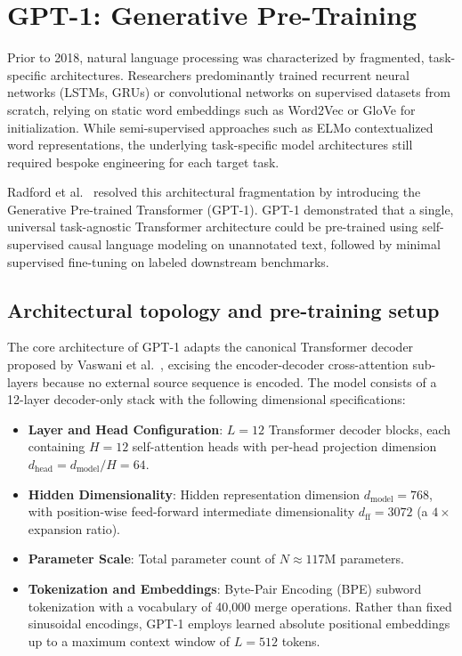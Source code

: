 \documentclass[../../main.tex]{subfiles}
\begin{document}
\section{GPT-1: Generative Pre-Training}
\label{sec:gpt1_architecture}

Prior to 2018, natural language processing was characterized by fragmented, task-specific architectures. Researchers predominantly trained recurrent neural networks (LSTMs, GRUs) or convolutional networks on supervised datasets from scratch, relying on static word embeddings such as Word2Vec or GloVe for initialization. While semi-supervised approaches such as ELMo contextualized word representations, the underlying task-specific model architectures still required bespoke engineering for each target task.

Radford et al.~\cite{radford2018} resolved this architectural fragmentation by introducing the Generative Pre-trained Transformer (GPT-1). GPT-1 demonstrated that a single, universal task-agnostic Transformer architecture could be pre-trained using self-supervised causal language modeling on unannotated text, followed by minimal supervised fine-tuning on labeled downstream benchmarks.


\subsection{Architectural topology and pre-training setup}
\label{subsec:gpt1_setup}

The core architecture of GPT-1 adapts the canonical Transformer decoder proposed by Vaswani et al.~\cite{vaswani2017}, excising the encoder-decoder cross-attention sub-layers because no external source sequence is encoded. The model consists of a 12-layer decoder-only stack with the following dimensional specifications:
\begin{itemize}
    \item \textbf{Layer and Head Configuration}: $L = 12$ Transformer decoder blocks, each containing $H = 12$ self-attention heads with per-head projection dimension $d_{\text{head}} = d_{\text{model}} / H = 64$.
    \item \textbf{Hidden Dimensionality}: Hidden representation dimension $d_{\text{model}} = 768$, with position-wise feed-forward intermediate dimensionality $d_{\text{ff}} = 3072$ (a $4\times$ expansion ratio).
    \item \textbf{Parameter Scale}: Total parameter count of $N \approx 117\text{M}$ parameters.
    \item \textbf{Tokenization and Embeddings}: Byte-Pair Encoding (BPE) subword tokenization with a vocabulary of 40,000 merge operations. Rather than fixed sinusoidal encodings, GPT-1 employs learned absolute positional embeddings up to a maximum context window of $L = 512$ tokens.
\end{itemize}
\end{document}
